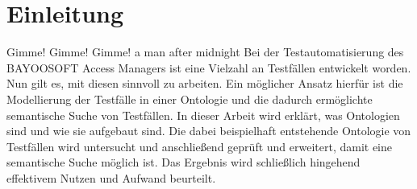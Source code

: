 \chapter{Einleitung}
Gimme! Gimme! Gimme! a man after midnight
Bei der Testautomatisierung des BAYOOSOFT Access Managers ist eine Vielzahl an Testfällen entwickelt worden. Nun gilt es, mit diesen sinnvoll zu arbeiten. Ein möglicher Ansatz hierfür ist die Modellierung der Testfälle in einer Ontologie und die dadurch ermöglichte semantische Suche von Testfällen. In dieser Arbeit wird erklärt, was Ontologien sind und wie sie aufgebaut sind. Die dabei beispielhaft entstehende Ontologie von Testfällen wird untersucht und anschließend geprüft und erweitert, damit eine semantische Suche möglich ist. Das Ergebnis wird schließlich hingehend effektivem Nutzen und Aufwand beurteilt.